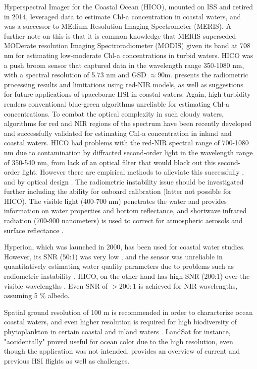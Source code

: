 Hyperspectral Imager for the Coastal Ocean (HICO), mounted on ISS and retired in 2014, leveraged data to estimate Chl-a concentration in coastal waters, and was a successor to MEdium Resolution Imaging Spectrometer (MERIS). A further note on this is that it is common knowledge that MERIS superseded MODerate resolution Imaging Spectroradiometer (MODIS) given its band at 708 nm for estimating low-moderate Chl-a concentrations in turbid waters. HICO was a push broom sensor that captured data in the wavelength range 350-1080 nm, with a spectral resolution of 5.73 nm and GSD $\approx 90$m. \cite{Moses2013} presents the radiometric processing results and limitations using red-NIR models, as well as suggestions for future applications of spaceborne HSI in coastal waters. Again, high turbidity renders conventional blue-green algorithms unreliable for estimating Chl-a concentrations. To combat the optical complexity in such cloudy waters, algorithms for red and NIR regions of the spectrum have been recently developed and successfully validated for estimating Chl-a concentration in inland and coastal waters. HICO had problems with the red-NIR spectral range of 700-1080 nm due to contamination by diffracted second-order light in the wavelength range of 350-540 nm, from lack of an optical filter that would block out this second-order light. However there are empirical methods to alleviate this successfully \cite{Li2012}, and by optical design \cite{Fred2017}. The radiometric instability issue should be investigated further including the ability for onboard calibration (latter not possible for HICO). The visible light (400-700 nm) penetrates the water and provides information on water properties and bottom reflectance, and shortwave infrared radiation (700-900 nanometers) is used to correct for atmospheric aerosols and surface reflectance \cite{Corson2011}.

Hyperion, which was launched in 2000, has been used for coastal water studies. However, its SNR (50:1) was
very low \cite{Hu2012}, and the sensor was unreliable in quantitatively estimating water quality parameters due to problems such as radiometric instability \cite{NRC2007}. HICO, on the other hand has high SNR (200:1) over the visible wavelengths \cite{Corson2011}. Even SNR of $>200:1$ is achieved for NIR wavelengths, assuming 5 \% albedo.

Spatial ground resolution of 100 m is recommended in order to characterize ocean coastal waters, and even higher resolution is required for high biodiversity of phytoplankton in certain coastal and inland waters \cite{Emberton2016}. LandSat for instance, "accidentally" proved useful for ocean color due to the high resolution, even though the application was not intended. \cite{Emberton2016} provides an overview of current and previous HSI flights as well as challenges.

